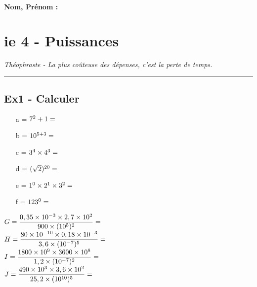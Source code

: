 \documentclass[12pt]{article}
\newcommand{\horrule}[1]{\rule{\linewidth}{#1}} %
\begin{document}

\newtheorem{Definition}{Définition}
\newtheorem{Theorem}{Théorème}
\newtheorem{Proposition}{Propriété}

\renewcommand{\labelitemi}{$\bullet$}
\renewcommand{\labelitemii}{$\circ$}

\setlength{\columnseprule}{1pt}

\textbf{Nom, Prénom : }

\section*{ie 4 - Puissances}
\begin{center}
  \textit{Théophraste - La plus coûteuse des dépenses, c’est la perte de temps.}
\end{center}
\horrule{2px}

\subsection*{Ex1 - Calculer}

\begin{multicols}{3}
  \begin{itemize}
  \item[a =] $7^2 + 1 =  \dotfill $
  \item[b =] $10^{5+3} =  \dotfill $
  \item[c =] $3^4 \times 4^3 =  \dotfill $
  \item[d =] $(\sqrt{2})^{20} =  \dotfill $
  \item[e =] $1^0 \times 2^1 \times 3^2 =  \dotfill $
  \item[f =] $123^0 =  \dotfill $
  \end{itemize}

\end{multicols}

\begin{multicols}{2}

  $G = \dfrac{0,35 \times 10^{-3} \times 2,7 \times 10^{2}}{900 \times (10^5)^2} =  \dotfill $\\
  $H = \dfrac{80 \times 10^{-10} \times 0,18 \times 10^{-3}}{3,6 \times (10^{-7})^5} =  \dotfill $ \\
  $I = \dfrac{1800 \times 10^{9} \times 3600 \times 10^{8}}{1,2 \times (10^{-7})^2} =  \dotfill $\\
  $J = \dfrac{490 \times 10^{3} \times 3,6 \times 10^{2}}{25,2 \times (10^{10})^5} =  \dotfill $ 

\end{multicols}
\end{document}
